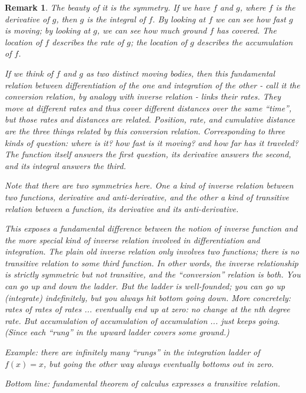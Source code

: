 \documentclass[reqno,12pt]{tufte-book}
\numberwithin{equation}{subsection}
\newtheorem{remark}{Remark}
\begin{document}
\begin{remark}
  The beauty of it is the symmetry.  If we have \(f\) and \(g\), where
  \(f\) is the derivative of \(g\), then \(g\) is the integral of
  \(f\).  By looking at \(f\) we can see how fast \(g\) is moving; by
  looking at \(g\), we can see how much ground \(f\) has covered.  The
  location of \(f\) describes the rate of \(g\); the location of \(g\)
  describes the accumulation of \(f\).

  If we think of \(f\) and \(g\) as two distinct moving bodies, then
  this fundamental relation between differentiation of the one and
  integration of the other - call it the conversion relation, by
  analogy with inverse relation - links their rates.  They move at
  different rates and thus cover different distances over the same
  ``time'', but those rates and distances are related.  Position,
  rate, and cumulative distance are the three things related by this
  conversion relation.  Corresponding to three kinds of question:
  where is it? how fast is it moving? and how far has it traveled?
  The function itself answers the first question, its derivative
  answers the second, and its integral answers the third.

  Note that there are two symmetries here.  One a kind of inverse
  relation between two functions, derivative and anti-derivative, and
  the other a kind of transitive relation between a function, its
  derivative and its anti-derivative.

  This exposes a fundamental difference between the notion of inverse
  function and the more special kind of inverse relation involved in
  differentiation and integration.  The plain old inverse relation
  only involves two functions; there is no transitive relation to some
  third function.  In other words, the inverse relationship is
  strictly symmetric but not transitive, and the ``conversion''
  relation is both.  You can go up and down the ladder.  But the
  ladder is well-founded; you can go up (integrate) indefinitely, but
  you always hit bottom going down.  More concretely: rates of rates
  of rates ... eventually end up at zero: no change at the nth degree
  rate.  But accumulation of accumulation of accumulation ... just
  keeps going.  (Since each ``rung'' in the upward ladder covers some
  ground.)

  Example: there are infinitely many ``rungs'' in the integration
  ladder of \(f(x)=x\), but going the other way always eventually
  bottoms out in zero.

  Bottom line: fundamental theorem of calculus expresses a transitive
  relation.


\end{remark}
\end{document}
